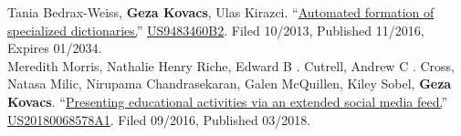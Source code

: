 
Tania Bedrax-Weiss, \textbf{Geza Kovacs}, Ulas Kirazci. ``\href{https://patents.google.com/patent/US9483460B2}{Automated formation of specialized dictionaries.}'' \hypersetup{urlcolor=black}\href{https://patents.google.com/patent/US9483460B2}{US9483460B2}\hypersetup{urlcolor=linkcol}. Filed 10/2013, Published 11/2016, Expires 01/2034.\\

Meredith Morris, Nathalie Henry Riche, Edward B . Cutrell, Andrew C . Cross, Natasa Milic, Nirupama Chandrasekaran, Galen McQuillen, Kiley Sobel, \textbf{Geza Kovacs}. ``\href{https://patents.google.com/patent/US20180068578A1}{Presenting educational activities via an extended social media feed.}'' \hypersetup{urlcolor=black}\href{https://patents.google.com/patent/US20180068578A1}{US20180068578A1}\hypersetup{urlcolor=linkcol}. Filed 09/2016, Published 03/2018.\\